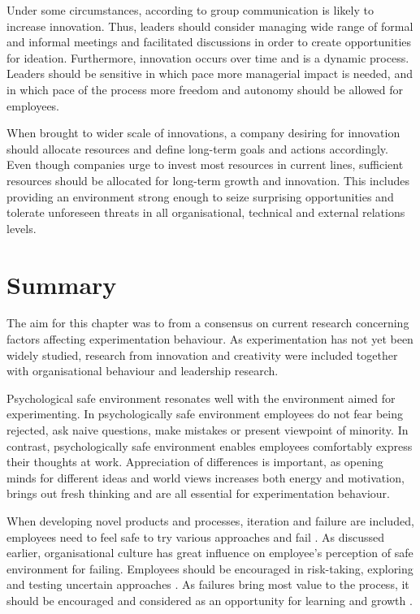Under some circumstances, according to \citet{monge1992communication} group communication is likely to increase innovation. Thus, leaders should consider managing wide range of formal and informal meetings and facilitated discussions in order to create opportunities for ideation. Furthermore, innovation occurs over time and is a dynamic process. Leaders should be sensitive in which pace more managerial impact is needed, and in which pace of the process more freedom and autonomy should be allowed for employees. \citep{monge1992communication} 

When brought to wider scale of innovations, a company desiring for innovation should allocate resources and define long-term goals and actions accordingly. Even though companies urge to invest most resources in current lines, sufficient resources should be allocated for long-term growth and innovation. This includes providing an environment strong enough to seize surprising opportunities and tolerate unforeseen threats in all organisational, technical and external relations levels. \citep{quinn1985managing} 

\section{Summary}
The aim for this chapter was to from a consensus on current research concerning factors affecting experimentation behaviour. As experimentation has not yet been widely studied, research from innovation and creativity were included together with organisational behaviour and leadership research.

Psychological safe environment resonates well with the environment aimed for experimenting. In psychologically safe environment employees do not fear being rejected, ask naive questions, make mistakes or present viewpoint of minority. In contrast, psychologically safe environment enables employees comfortably express their thoughts at work. Appreciation of differences is important, as opening minds for different ideas and world views increases both energy and motivation, brings out fresh thinking and are all essential for experimentation behaviour. \citep{garvin2008yours} 

When developing novel products and processes, iteration and failure are included, employees need to feel safe to try various approaches and fail \citep{shalley2004leaders}. As discussed earlier, organisational culture has great influence on employee's perception of safe environment for failing. Employees should be encouraged in risk-taking, exploring and testing uncertain approaches \citep{garvin2008yours}. As failures bring most value to the process, it should be encouraged \citep{thomke2001enlightened} and considered as an opportunity for learning and growth \citep{farson2002failuretolerantleader}. 

